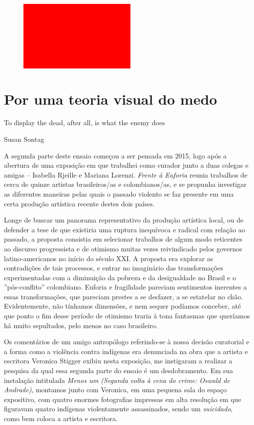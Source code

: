 \begin{figure}[!ht]
\centering
 \includegraphics[width=58mm]{./imgs/im1.jpg}
\caption{\footnotesize{}}
\end{figure}

\section{Por uma teoria visual do medo}

\epigraph{To display the dead, after all, is what the enemy does}{Susan Sontag}

A segunda parte deste ensaio começou a ser pensada em 2015, logo após a
abertura de uma exposição em que trabalhei como curador junto a duas
colegas e amigas -- Isabella Rjeille e Mariana Lorenzi. \emph{Frente à
Euforia} reunia trabalhos de cerca de quinze artistas brasileiros/as e
colombianos/as, e se propunha investigar as diferentes maneiras pelas
quais o passado violento se faz presente em uma certa produção artística
recente destes dois países.

Longe de buscar um panorama representativo da produção artística local,
ou de defender a tese de que existiria uma ruptura inequívoca e radical
com relação ao passado, a proposta consistia em selecionar trabalhos de
algum modo reticentes ao discurso progressista e de otimismo muitas
vezes reivindicado pelos governos latino-americanos no início do século
XXI. A proposta era explorar as contradições de tais processos, e entrar
no imaginário das transformações experimentadas com a diminuição da
pobreza e da desigualdade no Brasil e o ''pós-conflito'' colombiano.
Euforia e fragilidade pareciam sentimentos inerentes a essas
transformações, que pareciam prestes a se desfazer, a se estatelar no
chão. Evidentemente, não tínhamos dimensões, e nem sequer podíamos
conceber, até que ponto o fim desse período de otimismo traria à tona
fantasmas que queríamos há muito sepultados, pelo menos no caso
brasileiro.

Os comentários de um amigo antropólogo referindo-se à nossa decisão
curatorial e a forma como a violência contra indígenas era denunciada na
obra que a artista e escritora Veronica Stigger exibiu nesta exposição,
me instigaram a realizar a pesquisa da qual essa segunda parte do ensaio
é um desdobramento. Em sua instalação intitulada \emph{Menos um (Segunda
volta à cena do crime: Oswald de Andrade)}, montamos junto com Veronica,
em uma pequena sala do espaço expositivo, com quatro enormes fotografias
impressas em alta resolução em que figuravam quatro indígenas
violentamente assassinados, sendo um \emph{suicidado}, como bem coloca a
artista e escritora.

